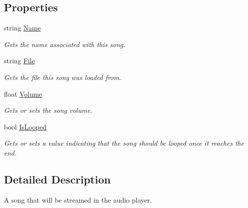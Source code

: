 \subsection*{Properties}
\begin{DoxyCompactItemize}
\item 
string \hyperlink{interface_tri_devs_1_1_tri_engine_1_1_audio_1_1_i_song_a91fdaeb52931f21f1d9b98e5ea49523e}{Name}
\begin{DoxyCompactList}\small\item\em Gets the name associated with this song. \end{DoxyCompactList}\item 
string \hyperlink{interface_tri_devs_1_1_tri_engine_1_1_audio_1_1_i_song_a205590d12f0472f544e82405d6594f38}{File}
\begin{DoxyCompactList}\small\item\em Gets the file this song was loaded from. \end{DoxyCompactList}\item 
float \hyperlink{interface_tri_devs_1_1_tri_engine_1_1_audio_1_1_i_song_aca29bef6067582a446c872d86b8b7130}{Volume}
\begin{DoxyCompactList}\small\item\em Gets or sets the song volume. \end{DoxyCompactList}\item 
bool \hyperlink{interface_tri_devs_1_1_tri_engine_1_1_audio_1_1_i_song_a4d3e7c993097fd4ee1397997395cf71d}{Is\-Looped}
\begin{DoxyCompactList}\small\item\em Gets or sets a value indicating that the song should be looped once it reaches the end. \end{DoxyCompactList}\end{DoxyCompactItemize}


\subsection{Detailed Description}
A song that will be streamed in the audio player. 



